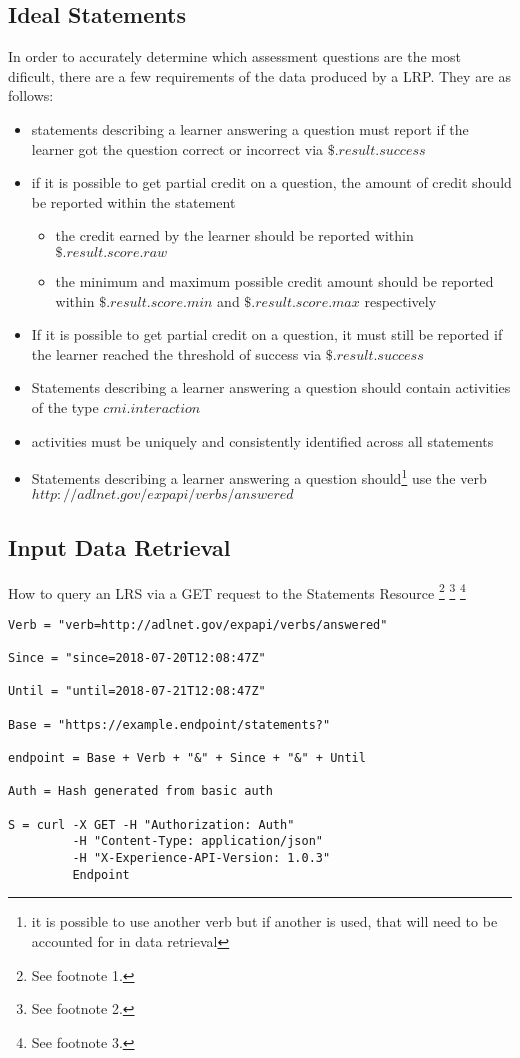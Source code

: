 \documentclass{article}
\begin{document}
\subsection{Ideal Statements}
In order to accurately determine which assessment questions are the
most dificult, there are a few requirements of the data produced by a
LRP. They are as follows:
\begin{itemize}
\item statements describing a learner answering a question must report
  if the learner got the question correct or incorrect via $\$.result.success$
\item if it is possible to get partial credit on a question, the amount
  of credit should be reported within the statement
  \begin{itemize}
  \item the credit earned by the learner should be reported within \\ $\$.result.score.raw$
  \item the minimum and maximum possible credit amount should be
    reported within $\$.result.score.min$ and $\$.result.score.max$
    respectively
  \end{itemize}
\item If it is possible to get partial credit on a question, it must
  still be reported if the learner reached the threshold of success
  via $\$.result.success$
\item Statements describing a learner answering a question should
  contain activities of the type $cmi.interaction$
\item activities must be uniquely and consistently identified across
  all statements
\item Statements describing a learner answering a question
  should\footnote{\label{verbIRI} it is possible to use another verb but if another is
      used, that will need to be accounted for in data retrieval} use
  the verb $http://adlnet.gov/expapi/verbs/answered$
\end{itemize}

\subsection{Input Data Retrieval}
How to query an LRS via a GET request to the Statements Resource
\footnote{\label{refMoreLink} See footnote 1.}
\footnote{\label{refnoZ} See footnote 2.}
\footnote{\label{refallTime} See footnote 3.}

\begin{lstlisting}[frame=single]
Verb = "verb=http://adlnet.gov/expapi/verbs/answered"

Since = "since=2018-07-20T12:08:47Z"

Until = "until=2018-07-21T12:08:47Z"

Base = "https://example.endpoint/statements?"

endpoint = Base + Verb + "&" + Since + "&" + Until

Auth = Hash generated from basic auth

S = curl -X GET -H "Authorization: Auth"
         -H "Content-Type: application/json"
         -H "X-Experience-API-Version: 1.0.3"
         Endpoint
\end{lstlisting}
\end{document}
